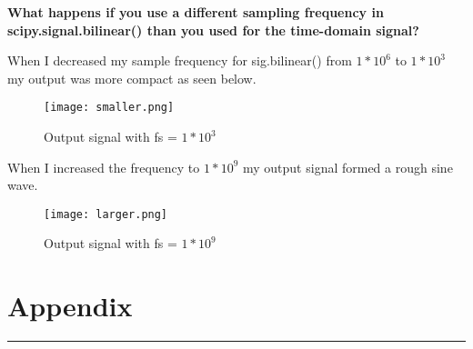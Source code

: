 \documentclass[12pt]{report}
\begin{document}
\textbf{What happens if you use a different sampling frequency in scipy.signal.bilinear() than you used for the time-domain signal?
}\par

\vspace{.5cm}
When I decreased my sample frequency for sig.bilinear() from $1*10^{6}$ to $1*10^{3}$ my output was more compact as seen below.

\begin{figure}[htp]
     \centering
     \texttt{[image: smaller.png]}
     \caption{Output signal with fs = $1*10^{3}$}
     \label{fig:my_label}
 \end{figure}
\vspace{1cm}

When I increased the frequency to $1*10^{9}$ my output signal formed a rough sine wave. 

\begin{figure}[htp]
     \centering
     \texttt{[image: larger.png]}
     \caption{Output signal with fs = $1*10^{9}$}
     \label{fig:my_label}
 \end{figure}
\vspace{1cm}
\newpage
\section*{Appendix}
\hrule
\vspace{1cm}
\setlength{\parindent}{5ex}
\end{document}
